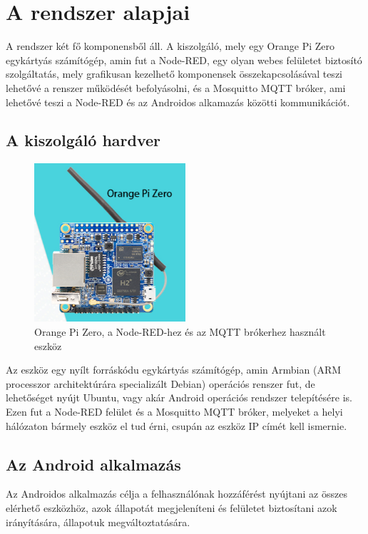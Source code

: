 \documentclass[
]{thesis-ekf}
\theoremstyle{definition}
\theoremstyle{remark}
\begin{document}
\chapter{A rendszer alapjai}
A rendszer két fő komponensből áll. A kiszolgáló, mely egy Orange Pi Zero egykártyás számítógép, amin fut a Node-RED, egy olyan webes felületet biztosító szolgáltatás, mely grafikusan kezelhető komponensek összekapcsolásával teszi lehetővé a renszer működését befolyásolni, és a Mosquitto MQTT bróker, ami lehetővé teszi a Node-RED\cite{nodeRed} és az Androidos alkamazás közötti kommunikációt.

\section{A kiszolgáló hardver}
\begin{figure}
	\centering
	\includegraphics[width=0.5\textwidth]{images/OPIZero.png}
	\caption{Orange Pi Zero\cite{orange}, a Node-RED-hez és az MQTT brókerhez használt eszköz}
\end{figure}	
Az eszköz egy nyílt forráskódu egykártyás számítógép, amin Armbian\cite{armbian} (ARM processzor architektúrára specializált Debian) operációs renszer fut, 
de lehetőséget nyújt Ubuntu, vagy akár Android operációs rendszer telepítésére is. Ezen fut a Node-RED felület és a Mosquitto MQTT bróker, 
melyeket a helyi hálózaton bármely eszköz el tud érni, csupán az eszköz IP címét kell ismernie.

\section{Az Android alkalmazás}
Az Androidos alkalmazás célja a felhasználónak hozzáférést nyújtani az összes elérhető eszközhöz, 
azok állapotát megjeleníteni és felületet biztosítani azok irányítására, állapotuk megváltoztatására. 
\end{document}
